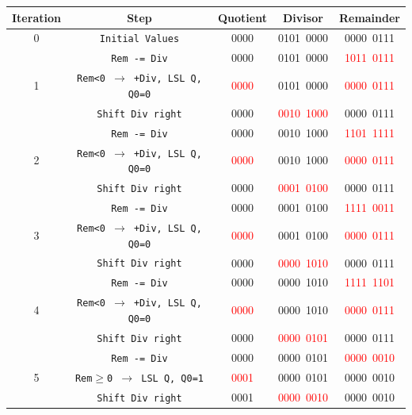 \documentclass[12pt]{article}
\begin{document}
\begin{table}[h!]
    \centering
    \begin{tabular}{|c|c|c|c|c|}
    \hline
    \textbf{Iteration} & \textbf{Step} & \textbf{Quotient} & \textbf{Divisor} & \textbf{Remainder}  \\
    \hline
    0 & \texttt{Initial Values} & 0000 & 0101\ 0000 & 0000\ 0111 \\
    \hline
    \multirow{3}{*}{1} 
    & \texttt{Rem -= Div} & 0000 & 0101\ 0000 & \textcolor{red}{1011\ 0111} \\
    \cline{2-5}
    & \texttt{Rem<0 $\rightarrow$ +Div, LSL Q, Q0=0} & \textcolor{red}{0000} & 0101\ 0000 & \textcolor{red}{0000\ 0111} \\
    \cline{2-5}
    & \texttt{Shift Div right} & 0000 & \textcolor{red}{0010\ 1000} & 0000\ 0111 \\
    \hline
    \multirow{3}{*}{2}
    & \texttt{Rem -= Div} & 0000 & 0010\ 1000 & \textcolor{red}{1101\ 1111} \\
    \cline{2-5}
    & \texttt{Rem<0 $\rightarrow$ +Div, LSL Q, Q0=0} & \textcolor{red}{0000} & 0010\ 1000 & \textcolor{red}{0000\ 0111} \\
    \cline{2-5}
    & \texttt{Shift Div right} & 0000 & \textcolor{red}{0001\ 0100} & 0000\ 0111 \\
    \hline
    \multirow{3}{*}{3}
    & \texttt{Rem -= Div} & 0000 & 0001\ 0100 & \textcolor{red}{1111\ 0011} \\
    \cline{2-5}
    & \texttt{Rem<0 $\rightarrow$ +Div, LSL Q, Q0=0} & \textcolor{red}{0000} & 0001\ 0100 & \textcolor{red}{0000\ 0111} \\
    \cline{2-5}
    & \texttt{Shift Div right} & 0000 & \textcolor{red}{0000\ 1010} & 0000\ 0111 \\
    \hline
    \multirow{3}{*}{4}
    & \texttt{Rem -= Div} & 0000 & 0000\ 1010 & \textcolor{red}{1111\ 1101} \\
    \cline{2-5}
    & \texttt{Rem<0 $\rightarrow$ +Div, LSL Q, Q0=0} & \textcolor{red}{0000} & 0000\ 1010 & \textcolor{red}{0000\ 0111} \\
    \cline{2-5}
    & \texttt{Shift Div right} & 0000 & \textcolor{red}{0000\ 0101} & 0000\ 0111 \\
    \hline
    \multirow{3}{*}{5} 
    & \texttt{Rem -= Div} & 0000 & 0000\ 0101 & \textcolor{red}{0000\ 0010} \\
    \cline{2-5}
    & \texttt{Rem$\geq$0 $\rightarrow$ LSL Q, Q0=1} & \textcolor{red}{0001} & 0000\ 0101 & 0000\ 0010 \\
    \cline{2-5}
    & \texttt{Shift Div right} & 0001 & \textcolor{red}{0000\ 0010} & 0000\ 0010 \\
    \hline
    \end{tabular}
\end{table}
\end{document}
